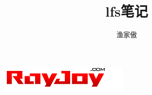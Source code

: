 \documentclass[11pt]{book}
\begin{document}
\title{lfs笔记}
\author{渔家傲}
\maketitle
\includegraphics{image/rayjoy.png}

\end{document}
